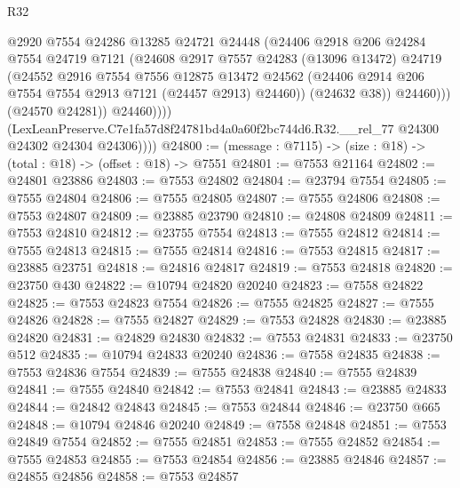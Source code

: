 \begin{lexlean}{R32}
\begin{coremodule}
                        @2920
                        @7554
                        @24286
                        @13285
                        @24721
                        @24448
                        (@24406
                          @2918
                          @206
                          @24284
                          @7554
                          @24719
                          @7121
                          (@24608
                            @2917
                            @7557
                            @24283
                            (@13096 @13472)
                            @24719
                            (@24552
                              @2916
                              @7554
                              @7556
                              @12875
                              @13472
                              @24562
                              (@24406 @2914 @206 @7554 @7554 @2913 @7121 (@24457 @2913) @24460))
                            (@24632 @38))
                          @24460)))
                    (@24570 @24281))
                  @24460))))
          (LexLeanPreserve.C7e1fa57d8f24781bd4a0a60f2bc744d6.R32.__rel_77
            @24300
            @24302
            @24304
            @24306))))
@24800 := (message : @7115) -> (size : @18) -> (total : @18) -> (offset : @18) -> @7551
@24801 := @7553 @21164
@24802 := @24801 @23886
@24803 := @7553 @24802
@24804 := @23794 @7554
@24805 := @7555 @24804
@24806 := @7555 @24805
@24807 := @7555 @24806
@24808 := @7553 @24807
@24809 := @23885 @23790
@24810 := @24808 @24809
@24811 := @7553 @24810
@24812 := @23755 @7554
@24813 := @7555 @24812
@24814 := @7555 @24813
@24815 := @7555 @24814
@24816 := @7553 @24815
@24817 := @23885 @23751
@24818 := @24816 @24817
@24819 := @7553 @24818
@24820 := @23750 @430
@24822 := @10794 @24820 @20240
@24823 := @7558 @24822
@24825 := @7553 @24823 @7554
@24826 := @7555 @24825
@24827 := @7555 @24826
@24828 := @7555 @24827
@24829 := @7553 @24828
@24830 := @23885 @24820
@24831 := @24829 @24830
@24832 := @7553 @24831
@24833 := @23750 @512
@24835 := @10794 @24833 @20240
@24836 := @7558 @24835
@24838 := @7553 @24836 @7554
@24839 := @7555 @24838
@24840 := @7555 @24839
@24841 := @7555 @24840
@24842 := @7553 @24841
@24843 := @23885 @24833
@24844 := @24842 @24843
@24845 := @7553 @24844
@24846 := @23750 @665
@24848 := @10794 @24846 @20240
@24849 := @7558 @24848
@24851 := @7553 @24849 @7554
@24852 := @7555 @24851
@24853 := @7555 @24852
@24854 := @7555 @24853
@24855 := @7553 @24854
@24856 := @23885 @24846
@24857 := @24855 @24856
@24858 := @7553 @24857

\end{coremodule}
\end{lexlean}
